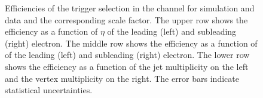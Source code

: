 \begin{figure}[htbp!]
\begin{center}
      \caption{Efficiencies of the trigger selection in the \ee channel for simulation and data and the corresponding scale factor. The upper row shows the efficiency as a function of $\eta$ of the leading (left) and subleading (right) electron. The middle row shows the efficiency as a function of \pt of the leading (left) and subleading (right) electron. The lower row shows the efficiency as a function of the jet multiplicity on the left and the vertex multiplicity on the right.
       The error bars indicate statistical uncertainties. }  
      
    \label{fig:MET_ee}
  \end{center}
\end{figure}

\begin{figure}[htbp!]
  \begin{center}

\end{center}
\end{figure}
